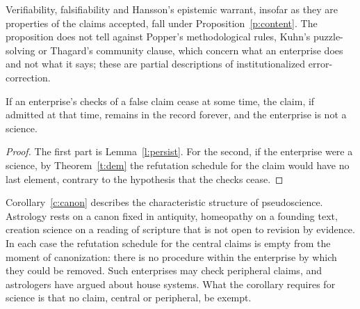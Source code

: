 \documentclass{situationist-preprint}
\begin{document}
Verifiability, falsifiability and Hansson's epistemic warrant, insofar as they are properties of the claims accepted, fall under Proposition~\ref{p:content}. The proposition does not tell against Popper's methodological rules, Kuhn's puzzle-solving or Thagard's community clause, which concern what an enterprise does and not what it says; these are partial descriptions of institutionalized error-correction.

\begin{corollary}\label{c:canon}
If an enterprise's checks of a false claim cease at some time, the claim, if admitted at that time, remains in the record forever, and the enterprise is not a science.
\end{corollary}

\begin{proof}
The first part is Lemma~\ref{l:persist}. For the second, if the enterprise were a science, by Theorem~\ref{t:dem} the refutation schedule for the claim would have no last element, contrary to the hypothesis that the checks cease.
\end{proof}

Corollary~\ref{c:canon} describes the characteristic structure of pseudoscience. Astrology rests on a canon fixed in antiquity, homeopathy on a founding text, creation science on a reading of scripture that is not open to revision by evidence. In each case the refutation schedule for the central claims is empty from the moment of canonization: there is no procedure within the enterprise by which they could be removed. Such enterprises may check peripheral claims, and astrologers have argued about house systems. What the corollary requires for science is that no claim, central or peripheral, be exempt.
\end{document}
